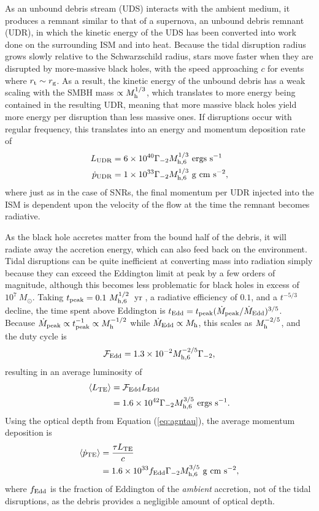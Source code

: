 \documentclass[preprint2]{aastex}
\newcommand{\mhsix}{M_{\rm h,6}\xspace}
\begin{document}
As an unbound debris stream (UDS) interacts with the ambient medium, it produces a remnant similar to that of a supernova, an unbound debris remnant (UDR), in which the kinetic energy of the UDS has been converted into work done on the surrounding ISM and into heat. Because the tidal disruption radius grows slowly relative to the Schwarzschild radius, stars move faster when they are disrupted by more-massive black holes, with the speed approaching $c$ for events where $r_{\rm t} \sim r_{\rm g}$. As a result, the kinetic energy of the unbound debris has a weak scaling with the SMBH mass $\propto M_{\rm h}^{1/3}$, which translates to more energy being contained in the resulting UDR, meaning that more massive black holes yield more energy per disruption than less massive ones. If disruptions occur with regular frequency, this translates into an energy and momentum deposition rate of
\begin{align}
L_{\rm UDR}  &= 6 \times 10^{40} \Gamma_{-2} \mhsix^{1/3}~{\rm ergs~s}^{-1}\\
\dot{p}_{\rm UDR}  &= 1 \times 10^{33} \Gamma_{-2} \mhsix^{1/3}~{\rm g~cm~s}^{-2}\label{eq:pudr},
\end{align}
where just as in the case of SNRs, the final momentum per UDR injected into the ISM is dependent upon the velocity of the flow at the time the remnant becomes radiative.
 
As the black hole accretes matter from the bound half of the debris, it will radiate away the accretion energy, which can also feed back on the environment. Tidal disruptions can be quite inefficient at converting mass into radiation simply because they can exceed the Eddington limit at peak by a few orders of magnitude, although this becomes less problematic for black holes in excess of $10^{7}~M_{\odot}$. Taking $t_{\rm peak} = 0.1~M_{\rm h,6}^{1/2}$~yr \citep{Guillochon:2013a}, a radiative efficiency of $0.1$, and a $t^{-5/3}$ decline, the time spent above Eddington is $t_{\rm Edd} = t_{\rm peak} (\dot{M}_{\rm peak}/\dot{M}_{\rm Edd})^{3/5}$. Because $\dot{M}_{\rm peak} \propto t_{\rm peak}^{-1} \propto M_{\rm h}^{-1/2}$ while $\dot{M}_{\rm Edd} \propto M_{\rm h}$, this scales as $M_{\rm h}^{-2/5}$, and the duty cycle is
\begin{align}
{\cal F}_{\rm Edd} = 1.3 \times 10^{-2} M_{\rm h,6}^{-2/5} \Gamma_{-2},
\end{align}
resulting in an average luminosity of
\begin{align}
\langle L_{\rm TE} \rangle &= {\cal F}_{\rm Edd} L_{\rm Edd}\nonumber\\
&= 1.6 \times 10^{42} \Gamma_{-2} M_{\rm h,6}^{3/5}~{\rm ergs~s}^{-1}.
\end{align}
Using the optical depth from Equation (\ref{eq:agntau}), the average momentum deposition is
\begin{align}
\langle \dot{p}_{\rm TE} \rangle &= \frac{\tau L_{\rm TE}}{c}\nonumber\\
&= 1.6 \times 10^{33} f_{\rm Edd} \Gamma_{-2} M_{\rm h, 6}^{3/5}~{\rm g~cm~s}^{-2},
\end{align}
where $f_{\rm Edd}$ is the fraction of Eddington of the {\it ambient} accretion, not of the tidal disruptions, as the debris provides a negligible amount of optical depth.
 
\end{document}
